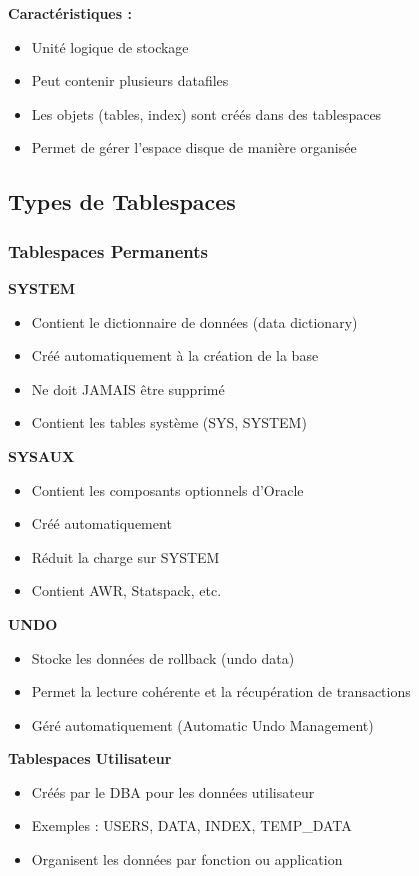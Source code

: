\documentclass[11pt,a4paper]{article}
\begin{document}
\textbf{Caractéristiques :}
\begin{itemize}
    \item Unité logique de stockage
    \item Peut contenir plusieurs datafiles
    \item Les objets (tables, index) sont créés dans des tablespaces
    \item Permet de gérer l'espace disque de manière organisée
\end{itemize}

\subsection{Types de Tablespaces}

\subsubsection{Tablespaces Permanents}

\textbf{SYSTEM}
\begin{itemize}
    \item Contient le dictionnaire de données (data dictionary)
    \item Créé automatiquement à la création de la base
    \item Ne doit JAMAIS être supprimé
    \item Contient les tables système (SYS, SYSTEM)
\end{itemize}

\textbf{SYSAUX}
\begin{itemize}
    \item Contient les composants optionnels d'Oracle
    \item Créé automatiquement
    \item Réduit la charge sur SYSTEM
    \item Contient AWR, Statspack, etc.
\end{itemize}

\textbf{UNDO}
\begin{itemize}
    \item Stocke les données de rollback (undo data)
    \item Permet la lecture cohérente et la récupération de transactions
    \item Géré automatiquement (Automatic Undo Management)
\end{itemize}

\textbf{Tablespaces Utilisateur}
\begin{itemize}
    \item Créés par le DBA pour les données utilisateur
    \item Exemples : USERS, DATA, INDEX, TEMP\_DATA
    \item Organisent les données par fonction ou application
\end{itemize}
\end{document}

